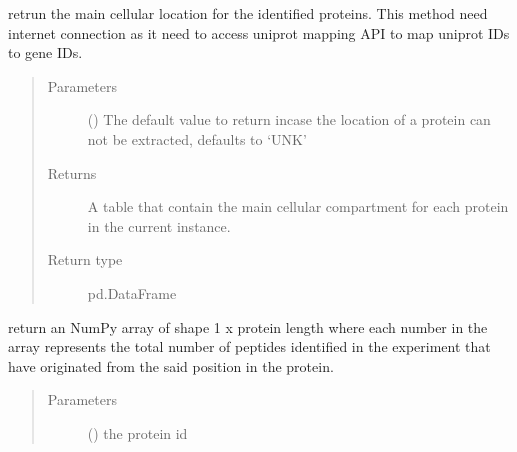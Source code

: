 \documentclass[letterpaper,10pt,english]{sphinxmanual}
\begin{document}
\begin{fulllineitems}
\begin{fulllineitems}
\label{\detokenize{IPTK.Classes:IPTK.Classes.Experiment.Experiment.get_main_sub_cellular_location_of_parent_proteins}}
retrun the main cellular location for the identified proteins.
This method need internet connection as it need to access uniprot mapping API to map uniprot IDs to gene IDs.
\begin{quote}\begin{description}
\item[{Parameters}] \leavevmode
{} (\sphinxstyleliteralemphasis{\sphinxupquote{, }}) \textendash{} The default value to return incase the location of a protein can not be extracted, defaults to ‘UNK’

\item[{Returns}] \leavevmode
A table that contain the main cellular compartment for each protein in the current instance.

\item[{Return type}] \leavevmode
pd.DataFrame

\end{description}\end{quote}

\end{fulllineitems}


\begin{fulllineitems}
\label{\detokenize{IPTK.Classes:IPTK.Classes.Experiment.Experiment.get_mapped_protein}}
return an NumPy array of shape 1 x protein length where each number in the array represents 
the total number of peptides identified in the experiment that have originated from the said position 
in the protein.
\begin{quote}\begin{description}
\item[{Parameters}] \leavevmode
{} () \textendash{} the protein id


\end{description}
\end{quote}
\end{fulllineitems}
\end{fulllineitems}
\end{document}
